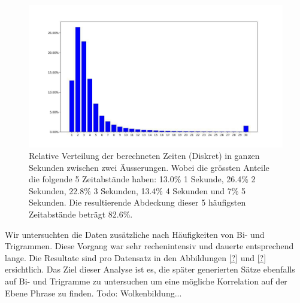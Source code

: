 \begin{figure}[h]
	\label{fig:data:analyse:timediff:opus}
	\centering
	\includegraphics[width=15cm]{img/opus_time_analyze.PNG}
	\caption{Relative Verteilung der berechneten Zeiten (Diskret) in ganzen Sekunden zwischen zwei Äusserungen. Wobei die grössten Anteile die folgende 5 Zeitabstände haben: 13.0\% 1 Sekunde, 26.4\% 2 Sekunden, 22.8\% 3 Sekunden, 13.4\% 4 Sekunden und 7\% 5 Sekunden. Die resultierende Abdeckung dieser 5 häufigsten Zeitabstände beträgt 82.6\%. \protect\footnotemark}
\end{figure}


Wir untersuchten die Daten zusätzliche nach Häufigkeiten von Bi- und Trigrammen. Diese Vorgang war sehr rechenintensiv und dauerte entsprechend lange. Die Resultate sind pro Datensatz in den Abbildungen \ref{?} und \ref{?} ersichtlich. Das Ziel dieser Analyse ist es, die später generierten Sätze ebenfalls auf Bi- und Trigramme zu untersuchen um eine mögliche Korrelation auf der Ebene Phrase zu finden.
Todo: Wolkenbildung...

